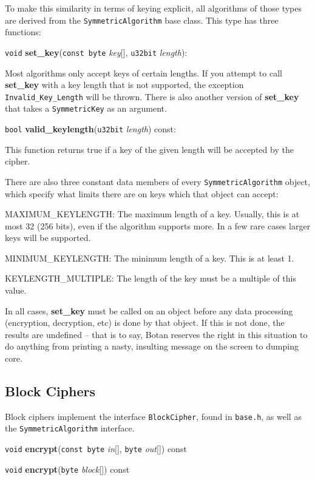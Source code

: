 \documentclass{article}
\newcommand{\filename}[1]{\texttt{#1}}
\newcommand{\function}[1]{\textbf{#1}}
\newcommand{\type}[1]{\texttt{#1}}
\renewcommand{\arg}[1]{\textsl{#1}}
\begin{document}
To make this similarity in terms of keying explicit, all algorithms of
those types are derived from the \type{SymmetricAlgorithm} base
class. This type has three functions:

\noindent
\type{void} \function{set\_key}(\type{const byte} \arg{key}[], \type{u32bit}
\arg{length}):

Most algorithms only accept keys of certain lengths. If you attempt to call
\function{set\_key} with a key length that is not supported, the exception
\type{Invalid\_Key\_Length} will be thrown. There is also another version of
\function{set\_key} that takes a \type{SymmetricKey} as an argument.

\noindent
\type{bool} \function{valid\_keylength}(\type{u32bit} \arg{length}) const:

This function returns true if a key of the given length will be accepted by
the cipher.

There are also three constant data members of every
\type{SymmetricAlgorithm} object, which specify what limits there are
on keys which that object can accept:

MAXIMUM\_KEYLENGTH: The maximum length of a key. Usually, this is at
most 32 (256 bits), even if the algorithm supports more. In a few rare
cases larger keys will be supported.

MINIMUM\_KEYLENGTH: The minimum length of a key. This is at least 1.

KEYLENGTH\_MULTIPLE: The length of the key must be a multiple of this value.

In all cases, \function{set\_key} must be called on an object before any data
processing (encryption, decryption, etc) is done by that object. If this is not
done, the results are undefined -- that is to say, Botan reserves the right in
this situation to do anything from printing a nasty, insulting message on the
screen to dumping core.

\subsection{Block Ciphers}

Block ciphers implement the interface \type{BlockCipher}, found in
\filename{base.h}, as well as the \type{SymmetricAlgorithm} interface.

\noindent
\type{void} \function{encrypt}(\type{const byte} \arg{in}[],
                               \type{byte} \arg{out}[]) const

\noindent
\type{void} \function{encrypt}(\type{byte} \arg{block}[]) const
\end{document}
